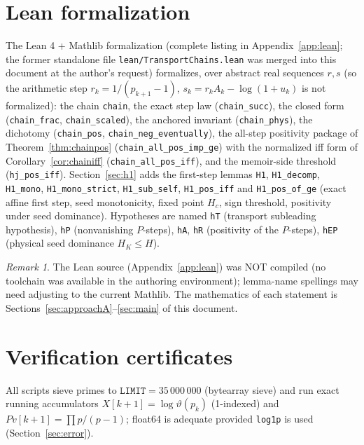 \documentclass[11pt]{article}
\theoremstyle{remark}
\newtheorem{remark}[theorem]{Remark}
\newcommand{\Ak}{A_k}
\newcommand{\uk}{u_k}
\newcommand{\rk}{r_k}
\begin{document}
\section{Lean formalization}\label{sec:lean}

The Lean 4 + Mathlib formalization (complete listing in
Appendix~\ref{app:lean}; the former standalone file
\texttt{lean/TransportChains.lean} was merged into this document at the
author's request) formalizes, over abstract real
sequences $r,s$ (so the arithmetic step $\rk=1/(p_{k+1}-1)$,
$s_k=\rk \Ak-\log(1+\uk)$ is not formalized): the chain \texttt{chain}, the
exact step law (\texttt{chain\_succ}), the closed form (\texttt{chain\_frac},
\texttt{chain\_scaled}), the anchored invariant (\texttt{chain\_phys}), the
dichotomy (\texttt{chain\_pos}, \texttt{chain\_neg\_eventually}), the
all-step positivity package of Theorem~\ref{thm:chainpos}
(\texttt{chain\_all\_pos\_imp\_ge}) with the normalized iff form of
Corollary~\ref{cor:chainiff} (\texttt{chain\_all\_pos\_iff}), and the
memoir-side threshold (\texttt{hj\_pos\_iff}). Section~\ref{sec:h1} adds the
first-step lemmas \texttt{H1}, \texttt{H1\_decomp}, \texttt{H1\_mono},
\texttt{H1\_mono\_strict}, \texttt{H1\_sub\_self}, \texttt{H1\_pos\_iff} and
\texttt{H1\_pos\_of\_ge} (exact affine first step, seed monotonicity, fixed
point $H_c$, sign threshold, positivity under seed dominance). Hypotheses are named
\texttt{hT} (transport subleading hypothesis), \texttt{hP}
(nonvanishing $P$-steps), \texttt{hA}, \texttt{hR} (positivity of the
$P$-steps), \texttt{hEP} (physical seed dominance $H_K\le H$).

\begin{remark}
The Lean source (Appendix~\ref{app:lean}) was NOT compiled (no toolchain was available in the authoring
environment); lemma-name spellings may need adjusting to the current Mathlib.
The mathematics of each statement is Sections~\ref{sec:approachA}--\ref{sec:main}
of this document.
\end{remark}

\section{Verification certificates}\label{sec:certs}

All scripts sieve primes to $\mathtt{LIMIT}=35\,000\,000$ (bytearray sieve) and
run exact running accumulators
$X[k{+}1]=\log\vartheta(p_k)$ (1-indexed) and $Pv[k{+}1]=\prod p/(p-1)$;
float64 is adequate provided \texttt{log1p} is used (Section~\ref{sec:error}).
\end{document}
